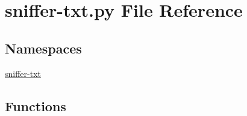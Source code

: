 \hypertarget{sniffer-txt_8py}{\section{sniffer-\/txt.py File Reference}
\label{sniffer-txt_8py}
}
\subsection*{Namespaces}
\begin{DoxyCompactItemize}
\item 
\hyperlink{namespacesniffer-txt}{sniffer-\/txt}
\end{DoxyCompactItemize}
\subsection*{Functions}
